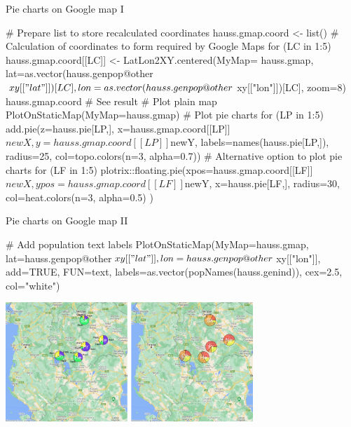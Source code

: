 \documentclass[compress, ucs, xelatex, 11pt, xcolor=svgnames, aspectratio=169,
	hyperref={
		bookmarks=true,
		unicode=true,
		colorlinks=true,
		pdftitle={Molecular data in R},
		plainpages=false,
		pdfauthor={Vojtech Zeisek},
		pdfsubject={Course about phylogeny and evolution in R},
		pdfcreator={XeLaTeX},
		pdfkeywords={R, evolution, phylogeny, molecular data},
		linkcolor=Crimson, %
		anchorcolor=Magenta, %
		citecolor=Magenta, %
		filecolor=Magenta, %
		menucolor=Magenta, %
		urlcolor=DodgerBlue, %
		pdftex},
	url={hyphens, lowtilde} %
	]{beamer}
\begin{document}
\begin{frame}[fragile]{Pie charts on Google map I}
	\begin{spluscode}
    # Prepare list to store recalculated coordinates
    hauss.gmap.coord <- list()
    # Calculation of coordinates to form required by Google Maps
    for (LC in 1:5) { hauss.gmap.coord[[LC]] <- LatLon2XY.centered(MyMap=
      hauss.gmap, lat=as.vector(hauss.genpop@other$xy[["lat"]])[LC],
      lon=as.vector(hauss.genpop@other$xy[["lon"]])[LC], zoom=8) }
    hauss.gmap.coord # See result
    # Plot plain map
    PlotOnStaticMap(MyMap=hauss.gmap)
    # Plot pie charts
    for (LP in 1:5) { add.pie(z=hauss.pie[LP,], x=hauss.gmap.coord[[LP]]
      $newX, y=hauss.gmap.coord[[LP]]$newY, labels=names(hauss.pie[LP,]),
      radius=25, col=topo.colors(n=3, alpha=0.7)) }
    # Alternative option to plot pie charts
    for (LF in 1:5) { plotrix::floating.pie(xpos=hauss.gmap.coord[[LF]]
      $newX, ypos=hauss.gmap.coord[[LF]]$newY, x=hauss.pie[LF,], radius=30,
      col=heat.colors(n=3, alpha=0.5) ) }
	\end{spluscode}
\end{frame}

\begin{frame}[fragile]{Pie charts on Google map II}
	\begin{spluscode}
    # Add population text labels
    PlotOnStaticMap(MyMap=hauss.gmap, lat=hauss.genpop@other$xy[["lat"]],
      lon=hauss.genpop@other$xy[["lon"]], add=TRUE, FUN=text,
      labels=as.vector(popNames(hauss.genind)), cex=2.5, col="white")
	\end{spluscode}
	\begin{center}
		\includegraphics[height=4.5cm]{map_pie_google.jpg}
	\end{center}
\end{frame}
\end{document}

